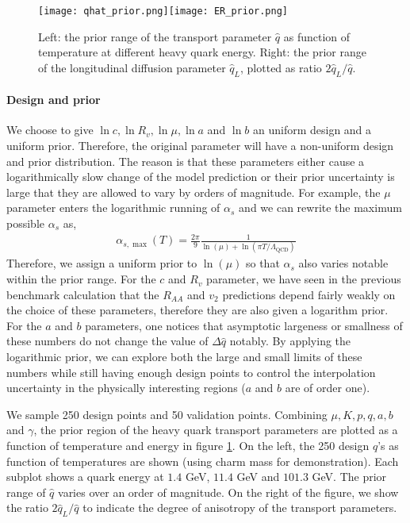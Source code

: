 \begin{figure}
\singlespacing
\centering
\texttt{[image: qhat\_prior.png]}\texttt{[image: ER\_prior.png]}
\caption[Left: the prior range of the transport parameter $\hat{q}$ as function]{Left: the prior range of the transport parameter $\hat{q}$ as function of temperature at different heavy quark energy. Right: the prior range of the longitudinal diffusion parameter $\hat{q}_L$, plotted as ratio $2\hat{q}_L/\hat{q}$.}
\label{fig:new:design-qhat}
\end{figure}

\paragraph{Design and prior} 
We choose to give $\ln c, \ln R_v, \ln \mu, \ln a$ and $\ln b$ an uniform design and a uniform prior.
Therefore, the original parameter will have a non-uniform design and prior distribution.
The reason is that these parameters either cause a logarithmically slow change of the model prediction or their prior uncertainty is large that they are allowed to vary by orders of magnitude.
For example, the $\mu$ parameter enters the logarithmic running of $\alpha_s$ and we can rewrite the maximum possible $\alpha_s$ as,
\begin{eqnarray}
\alpha_{s,\max}(T) = \frac{2\pi}{9}\frac{1}{\ln(\mu) + \ln(\pi T/\Lambda_{\textrm{QCD}})}
\end{eqnarray}
Therefore, we assign a uniform prior to $\ln(\mu)$ so that $\alpha_s$ also varies notable within the prior range.
For the $c$ and $R_v$ parameter, we have seen in the previous benchmark calculation that the $R_{AA}$ and $v_2$ predictions depend fairly weakly on the choice of these parameters, therefore they are also given a logarithm prior.
For the $a$ and $b$ parameters, one notices that asymptotic largeness or smallness of these numbers do not change the value of $\Delta \hat{q}$ notably.
By applying the logarithmic prior, we can explore both the large and small limits of these numbers while still having enough design points to control the interpolation uncertainty in the physically interesting regions ($a$ and $b$ are of order one). 

We sample 250 design points and 50 validation points. 
Combining $\mu, K, p, q, a, b$ and $\gamma$, the prior region of the heavy quark transport parameters are plotted as a function of temperature and energy in figure \ref{fig:new:design-qhat}. 
On the left, the 250 design $\hat{q}$'s as function of temperatures are shown  (using charm mass for demonstration).
Each subplot shows a quark energy at $1.4$ GeV, $11.4$ GeV and $101.3$ GeV.
The prior range of $\hat{q}$ varies over an order of magnitude.
On the right of the figure, we show the ratio $2\hat{q}_L/\hat{q}$ to indicate the degree of anisotropy of the transport parameters.

